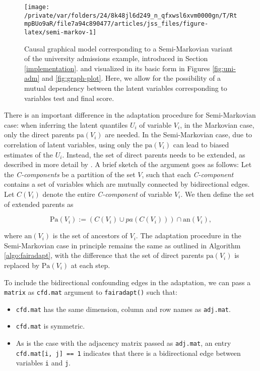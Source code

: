\documentclass[
  nojss]{jss}
\providecommand{\tightlist}{%
  \setlength{\itemsep}{0pt}\setlength{\parskip}{0pt}}
\begin{document}
\begin{CodeChunk}
\begin{figure}

{\centering \texttt{[image: /private/var/folders/24/8k48jl6d249\_n\_qfxwsl6xvm0000gn/T/RtmpBUo9aR/file7a94c890477/articles/jss\_files/figure-latex/semi-markov-1]} 

}

\caption{Causal graphical model corresponding to a Semi-Markovian variant of the university admissions example, introduced in Section \ref{implementation}.  and visualized in its basic form in Figures \ref{fig:uni-adm} and \ref{fig:graph-plot}. Here, we allow for the possibility of a mutual dependency between the latent variables corresponding to variables test and final score.}\label{fig:semi-markov}
\end{figure}
\end{CodeChunk}

There is an important difference in the adaptation procedure for
Semi-Markovian case: when inferring the latent quantiles \(U_i\) of
variable \(V_i\), in the Markovian case, only the direct parents
\(\mathrm{pa}(V_i)\) are needed. In the Semi-Markovian case, due to
correlation of latent variables, using only the \(\mathrm{pa}(V_i)\) can
lead to biased estimates of the \(U_i\). Instead, the set of direct
parents needs to be extended, as described in more detail by
\citet{tian2002general}. A brief sketch of the argument goes as follows:
Let the \emph{C-components} be a partition of the set \(V\), such that
each \emph{C-component} contains a set of variables which are mutually
connected by bidirectional edges. Let \(C(V_i)\) denote the entire
\emph{C-component} of variable \(V_i\). We then define the set of
extended parents as

\[\mathrm{Pa}(V_i) := (C(V_i) \cup pa(C(V_i))) \cap \mathrm{an}(V_i),\]

where \(\mathrm{an}(V_i)\) is the set of ancestors of \(V_i\). The
adaptation procedure in the Semi-Markovian case in principle remains the
same as outlined in Algorithm \ref{algo:fairadapt}, with the difference
that the set of direct parents \(\mathrm{pa}(V_i)\) is replaced by
\(\mathrm{Pa}(V_i)\) at each step.

To include the bidirectional confounding edges in the adaptation, we can
pass a \texttt{matrix} as \texttt{cfd.mat} argument to
\texttt{fairadapt()} such that:

\begin{itemize}
\tightlist
\item
  \texttt{cfd.mat} has the same dimension, column and row names as
  \texttt{adj.mat}.
\item
  \texttt{cfd.mat} is symmetric.
\item
  As is the case with the adjacency matrix passed as \texttt{adj.mat},
  an entry \texttt{cfd.mat{[}i,\ j{]}\ ==\ 1} indicates that there is a
  bidirectional edge between variables \texttt{i} and \texttt{j}.
\end{itemize}
\end{document}

